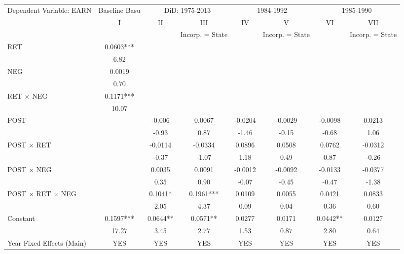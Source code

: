 \begin{landscape}
\begin{table}[H]
		\begin{tabular}{lccccccc}
			\toprule
			\toprule
			Dependent Variable: EARN & Baseline Basu & \multicolumn{2}{c}{DiD: 1975-2013} & \multicolumn{2}{c}{1984-1992} & \multicolumn{2}{c}{1985-1990} \\
			& I     & II & III & IV & V& VI & VII \\
			&  &  & Incorp. = State &  & Incorp. = State&  & Incorp. = State\\
			\midrule
			RET   & 0.0603*** &       &       &       &       &       &  \\
			& 6.82  &       &       &       &       &       &  \\
			NEG   & 0.0019 &       &       &       &       &       &  \\
			& 0.70  &       &       &       &       &       &  \\
			\rowcolor[rgb]{ .851,  .851,  .851} RET $\times$ NEG & 0.1171*** &       &       &       &       &       &  \\
			\rowcolor[rgb]{ .851,  .851,  .851}       & 10.07 &       &       &       &       &       &  \\
			POST  &       & -0.006 & 0.0067 & -0.0204 & -0.0029 & -0.0098 & 0.0213 \\
			&       & -0.93 & 0.87  & -1.46 & -0.15 & -0.68 & 1.06 \\
			\rowcolor[rgb]{ .851,  .851,  .851} POST $\times$ RET &       & -0.0114 & -0.0334 & 0.0896 & 0.0508 & 0.0762 & -0.0312 \\
			\rowcolor[rgb]{ .851,  .851,  .851}       &       & -0.37 & -1.07 & 1.18  & 0.49  & 0.87  & -0.26 \\
			POST $\times$ NEG &       & 0.0035 & 0.0091 & -0.0012 & -0.0092 & -0.0133 & -0.0377 \\
			&       & 0.35  & 0.90  & -0.07 & -0.45 & -0.47 & -1.38 \\
			\rowcolor[rgb]{ .851,  .851,  .851} POST $\times$ RET $\times$ NEG &       & 0.1041* & 0.1961*** & 0.0109 & 0.0055 & 0.0421 & 0.0833 \\
			\rowcolor[rgb]{ .851,  .851,  .851}       &       & 2.05  & 4.37  & 0.09  & 0.04  & 0.36  & 0.60 \\
			Constant & 0.1597*** & 0.0644** & 0.0571** & 0.0277 & 0.0171 & 0.0442** & 0.0127 \\
			& 17.27 & 3.45  & 2.77  & 1.53  & 0.87  & 2.80 & 0.64 \\
			Year Fixed Effects (Main) & YES   & YES   & YES   & YES   & YES   & YES   & YES \\

\end{tabular}
\end{table}
\end{landscape}
